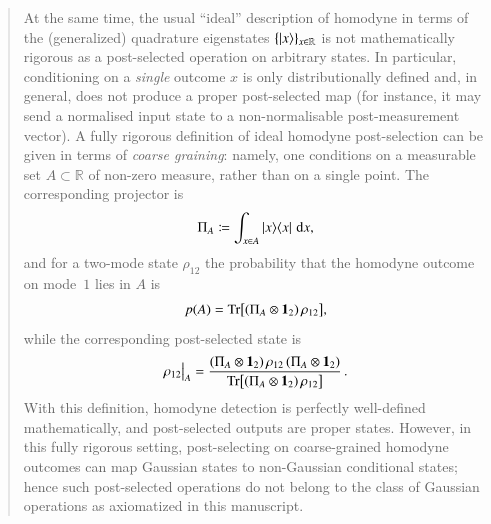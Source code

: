 \documentclass[a4paper,12pt]{article}
\newenvironment{Response}
{\noindent \color{RawSienna}{\bf Response:} }
{\vspace{0.4 cm}}
\begin{document}
\begin{Response}
\begin{quote}
At the same time, the usual ``ideal'' description of homodyne in terms of the (generalized) quadrature eigenstates $\{\ket{x}\}_{x\in\mathbb{R}}$ is not mathematically rigorous as a post-selected operation on arbitrary states. In particular, conditioning on a \emph{single} outcome $x$ is only distributionally defined and, in general, does not produce a proper post-selected map (for instance, it may send a normalised input state to a non-normalisable post-measurement vector). A fully rigorous definition of ideal homodyne post-selection can be given in terms of \emph{coarse graining}: namely, one conditions on a measurable set $A\subset\mathbb{R}$ of non-zero measure, rather than on a single point. The corresponding projector is
\[
\Pi_A \coloneqq \int_{x\in A}\ket{x}\!\bra{x}\,\mathrm dx,
\]
and for a two-mode state $\rho_{12}$ the probability that the homodyne outcome on mode~$1$ lies in $A$ is
\[
p(A)=\Tr\bigl[(\Pi_A\otimes \mathbf{1}_2)\,\rho_{12}\bigr],
\]
while the corresponding post-selected state is
\[
\rho_{12}\big|_A
=
\frac{(\Pi_A\otimes \mathbf{1}_2)\,\rho_{12}\,(\Pi_A\otimes \mathbf{1}_2)}
{\Tr\bigl[(\Pi_A\otimes \mathbf{1}_2)\,\rho_{12}\bigr]}\,.
\]
With this definition, homodyne detection is perfectly well-defined mathematically, and post-selected outputs are proper states. However, in this fully rigorous setting, post-selecting on coarse-grained homodyne outcomes can map Gaussian states to non-Gaussian conditional states; hence such post-selected operations do not belong to the class of Gaussian operations as axiomatized in this manuscript.
\end{quote}


    
\end{Response}
\end{document}
